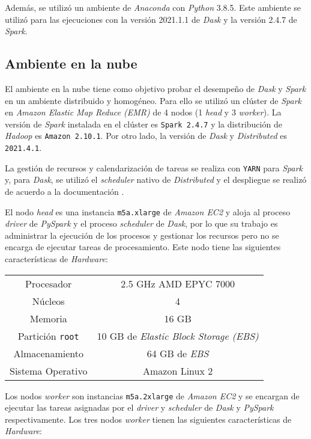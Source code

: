 Además, se utilizó un ambiente de \textit{Anaconda} con \textit{Python} 3.8.5. Este ambiente se utilizó para las ejecuciones con la versión 2021.1.1 de \textit{Dask} y la versión 2.4.7 de \textit{Spark}. 

\subsection{Ambiente en la nube}

El ambiente en la nube tiene como objetivo probar el desempeño de \textit{Dask} y \textit{Spark} en un ambiente distribuido y homogéneo. Para ello se utilizó un clúster de \textit{Spark} en \textit{Amazon Elastic Map Reduce (EMR)} de 4 nodos (1 \textit{head} y 3 \textit{worker}). La versión de \textit{Spark} instalada en el clúster es \texttt{Spark 2.4.7} y la distribución de \textit{Hadoop} es \texttt{Amazon 2.10.1}. Por otro lado, la versión de \textit{Dask} y \textit{Distributed} es \texttt{2021.4.1}. 


La gestión de recursos y calendarización de tareas se realiza con \texttt{YARN} para \textit{Spark} y, para \textit{Dask}, se utilizó el \textit{scheduler} nativo de \textit{Distributed} y el despliegue se realizó de acuerdo a la documentación \cite{daskdistributedsetup}.

El nodo \textit{head} es una instancia \texttt{m5a.xlarge} de \textit{Amazon EC2} y aloja al proceso \textit{driver} de \textit{PySpark} y el proceso \textit{scheduler} de \textit{Dask}, por lo que su trabajo es administrar la ejecución de los procesos y gestionar los recursos pero no se encarga de ejecutar tareas de procesamiento. Este nodo tiene las siguientes características de \textit{Hardware}:

\begin{center}
\begin{tabular}{|c|c|}
 \hline
  Procesador & 2.5 GHz AMD EPYC 7000 \\ 
  Núcleos & 4 \\
  Memoria & 16 GB \\ 
  Partición \texttt{root} & 10 GB de \textit{Elastic Block Storage (EBS)}  \\
  Almacenamiento & 64 GB de \textit{EBS}  \\ 
  Sistema Operativo & Amazon Linux 2 \\
  \hline
\end{tabular}
\end{center}

Los nodos \textit{worker} son instancias \texttt{m5a.2xlarge}  de \textit{Amazon EC2} y se encargan de ejecutar las tareas asignadas por el \textit{driver} y \textit{scheduler} de \textit{Dask} y \textit{PySpark} respectivamente. Los tres nodos \textit{worker} tienen las siguientes características de \textit{Hardware}:

